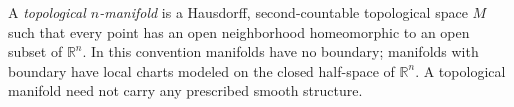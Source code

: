 
A \emph{topological $n$-manifold} is a Hausdorff, second-countable topological space $M$ such that every point has an open neighborhood homeomorphic to an open subset of $\mathbb R^n$. In this convention manifolds have no boundary; manifolds with boundary have local charts modeled on the closed half-space of $\mathbb R^n$. A topological manifold need not carry any prescribed smooth structure.

